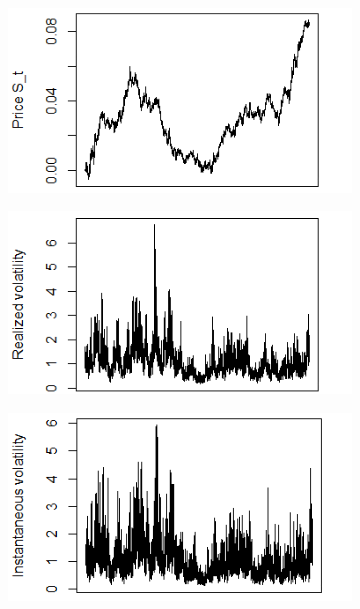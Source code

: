 \documentclass{article}
\begin{document}
\begin{figure}[htbp]
    \centering
    
    \begin{subfigure}{0.32\textwidth}
        \includegraphics[width=\linewidth]{H01_S.png}
    \end{subfigure}
    \hfill
    \begin{subfigure}{0.32\textwidth}
        \includegraphics[width=\linewidth]{H01_RV.png}
    \end{subfigure}
    \hfill
    \begin{subfigure}{0.32\textwidth}
        \includegraphics[width=\linewidth]{H01_IV.png}

\end{subfigure}
\end{figure}
\end{document}
